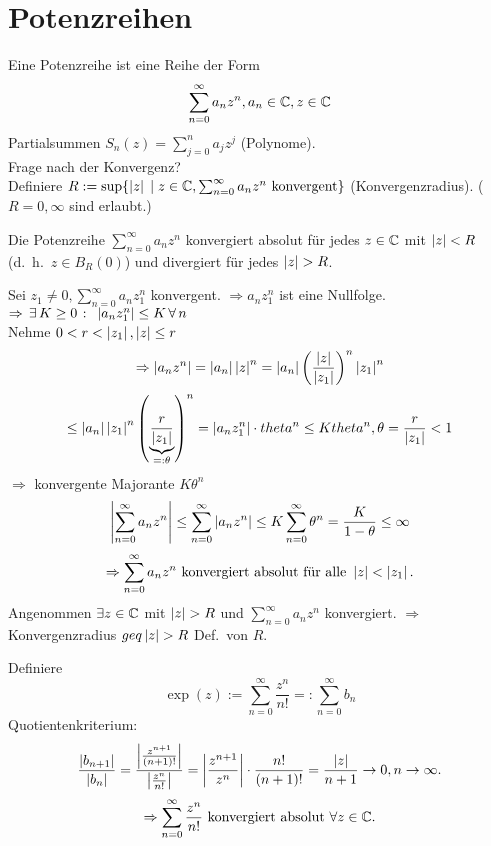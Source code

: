 \documentclass[../ana1.tex]{subfiles}
\begin{document}
\setcounter{section}{13}
\section{Potenzreihen}

\begin{prosa}
    Eine Potenzreihe ist eine Reihe der Form
    \[ \sum_{n=0}^\infty a_n z^n, a_n \in\mathbb{C}, z \in\mathbb{C} \] 
    Partialsummen \( S_n(z) = \sum_{j=0}^n a_j z^j \) (Polynome).\\
    Frage nach der Konvergenz?\\
    Definiere \( R:= \sup \{ \left|z\right| \;\vert \; z\in\mathbb{C}, \sum_{n=0}^\infty a_n z^n \text{ konvergent} \} \)
    (Konvergenzradius). (\( R = 0, \infty \) sind erlaubt.)
\end{prosa}
\begin{lem}
    Die Potenzreihe \( \sum_{n=0}^\infty a_n z^n \) konvergiert absolut für jedes \( z\in\mathbb{C} \) mit \( \left|z\right| < R \) (d.\ h.\  \( z\in B_R(0) \)) und divergiert für jedes \( \left|z\right| > R \).
\end{lem}
\begin{bew}
    Sei \( z_1 \neq 0, \sum_{n=0}^\infty a_n z_1^n \) konvergent.
    \( \Rightarrow a_n z_1^n \) ist eine Nullfolge.
    \( \Rightarrow \, \exists \, K \geq 0 \; \colon \; \left|a_n z_1^n\right| \leq K \,\forall \, n \) \\
    Nehme \( 0<r < \left|z_1\right|, \left|z\right| \leq r \)
    \[ \Rightarrow \left|a_n z^n\right| = \left|a_n\right| \left|z\right|^n = \left|a_n\right| { \left( \frac{\left|z\right|}{\left|z_1\right|} \right) }^n \left|z_1\right|^n \]
    \[ \leq \left|a_n\right|\left|z_1\right|^n {\left( \underbrace{\frac{r}{\left|z_1\right|}}_{=: \theta} \right)}^n = \left|a_n z_1^n\right| \cdot theta^n \leq K theta^n, \theta = \frac{r}{\left|z_1\right|} < 1 \]
    \( \Rightarrow \) konvergente Majorante \( K \theta^n \) \\
    \[ \left| \sum_{n=0}^\infty a_n z^n \right| \leq \sum_{n=0}^\infty \left| a_n z^n \right| \leq K \sum_{n=0}^\infty \theta^n = \frac{K}{1 - \theta} \leq \infty \]
    \[ \Rightarrow \sum_{n=0}^\infty a_n z^n \text{ konvergiert absolut für alle } \left|z\right| < \left|z_1\right|. \]
    Angenommen \( \exists z\in\mathbb{C} \) mit \( \left|z\right| > R \) und \( \sum_{n=0}^\infty a_n z^n \) konvergiert.
    \( \Rightarrow \) Konvergenzradius \(geq \left|z\right| > R \) \Lightning{} Def.\ von \(R\).
\end{bew}
\begin{bsp}
    Definiere
    \[ \exp(z) := \sum_{n=0}^\infty \frac{z^n}{n!} =: \sum_{n=0}^\infty b_n \]
    Quotientenkriterium:
    \[ \frac{\left|b_{n+1}\right|}{\left|b_n\right|} = \frac{ \left| \frac{ z^{n+1} }{ (n+1)! } \right| }{ \left| \frac{ z^n }{ n! } \right| } = \left| \frac{ z^{n+1} }{ z^n } \right| \cdot \frac{ n! }{ (n+1)! } = \frac{\left|z\right|}{n+1} \rightarrow 0, n\rightarrow\infty. \]
    \[ \Rightarrow \sum_{n=0}^\infty \frac{z^n}{n!} \text{ konvergiert absolut } \forall z\in\mathbb{C}. \]
\end{bsp}
\end{document}
